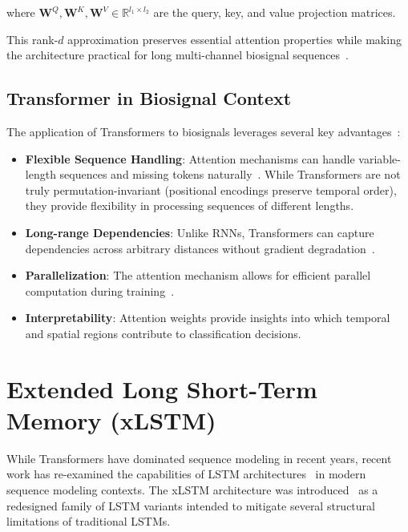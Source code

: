 where $\mathbf{W}^Q, \mathbf{W}^K, \mathbf{W}^V \in \mathbb{R}^{l_1 \times l_2}$ are the query, key, and value projection matrices.

This rank-$d$ approximation preserves essential attention properties while making the architecture practical for long multi-channel biosignal sequences~\cite{yang2023biot}.

\subsection{Transformer in Biosignal Context}

The application of Transformers to biosignals leverages several key advantages~\cite{vaswani2017attention,yang2023biot}:

\begin{itemize}
    \item \textbf{Flexible Sequence Handling}: Attention mechanisms can handle variable-length sequences and missing tokens naturally~\cite{yang2023biot}. While Transformers are not truly permutation-invariant (positional encodings preserve temporal order), they provide flexibility in processing sequences of different lengths.
    
    \item \textbf{Long-range Dependencies}: Unlike \acp{RNN}, Transformers can capture dependencies across arbitrary distances without gradient degradation~\cite{vaswani2017attention}.
    
    \item \textbf{Parallelization}: The attention mechanism allows for efficient parallel computation during training~\cite{vaswani2017attention}.
    
    \item \textbf{Interpretability}: Attention weights provide insights into which temporal and spatial regions contribute to classification decisions.
\end{itemize}


\section{Extended Long Short-Term Memory (xLSTM)}
\label{sec:background:xlstm}

While Transformers have dominated sequence modeling in recent years, recent work has re-examined the capabilities of \ac{LSTM} architectures~\cite{hochreiter1997lstm} in modern sequence modeling contexts. The \acf{xLSTM} architecture was introduced~\cite{beck2024xlstm} as a redesigned family of LSTM variants intended to mitigate several structural limitations of traditional \acp{LSTM}.

